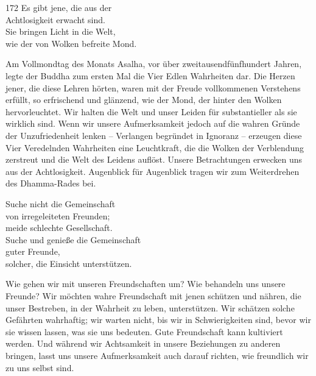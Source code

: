 
\begin{dhpVerse}{172}
\label{dhp-172}
Es gibt jene, die  aus der\\ 
Achtlosigkeit erwacht sind.\\ 
Sie bringen Licht in die Welt,\\ 
wie der von Wolken befreite Mond. 
\end{dhpVerse}

\begin{dhpRefl}

Am Vollmondtag des Monats Asalha, vor über zweitausendfünfhundert Jahren,
legte der Buddha zum ersten Mal die Vier Edlen Wahrheiten dar. Die Herzen
jener, die diese Lehren hörten, waren mit der Freude vollkommenen Verstehens
erfüllt, so erfrischend und glänzend, wie der Mond, der hinter den Wolken
hervorleuchtet. Wir halten die Welt und unser Leiden für substantieller als
sie wirklich sind. Wenn wir unsere Aufmerksamkeit jedoch auf die wahren Gründe
der Unzufriedenheit lenken -- Verlangen begründet in Ignoranz -- erzeugen
diese Vier Veredelnden Wahrheiten eine Leuchtkraft, die die Wolken der
Verblendung zerstreut und die Welt des Leidens auflöst. Unsere Betrachtungen
erwecken uns aus der Achtlosigkeit. Augenblick für Augenblick tragen wir zum
Weiterdrehen des Dhamma-Rades bei.

\end{dhpRefl}


\begin{dhpVerse}{78}
\label{dhp-78}
Suche nicht die Gemeinschaft\\ 
von irregeleiteten Freunden;\\ 
meide schlechte Gesellschaft.\\ 
Suche und genieße die Gemeinschaft\\ 
guter Freunde,\\ 
solcher, die Einsicht unterstützen. 
\end{dhpVerse}

\begin{dhpRefl}

Wie gehen wir mit unseren Freundschaften um? Wie behandeln uns unsere Freunde?
Wir möchten wahre Freundschaft mit jenen schützen und nähren, die unser
Bestreben, in der Wahrheit zu leben, unterstützen. Wir schätzen solche
Gefährten wahrhaftig; wir warten nicht, bis wir in Schwierigkeiten sind, bevor
wir sie wissen lassen, was sie uns bedeuten. Gute Freundschaft kann kultiviert
werden. Und während wir Achtsamkeit in unsere Beziehungen zu anderen bringen,
lasst uns unsere Aufmerksamkeit auch darauf richten, wie freundlich wir zu uns
selbst sind.

\end{dhpRefl}

